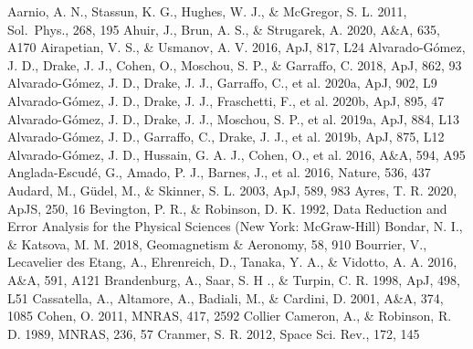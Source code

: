 \documentclass[preprint]{aastex}
\begin{document}
\begin{thebibliography}{}
Aarnio, A. N., Stassun, K. G., Hughes, W. J., \& McGregor, S. L. 2011,
  Sol.~Phys., 268, 195
Ahuir, J., Brun, A. S., \& Strugarek, A. 2020, A\&A, 635, A170
Airapetian, V. S., \& Usmanov, A. V. 2016, ApJ, 817, L24
Alvarado-G\'{o}mez, J. D., Drake, J. J., Cohen, O., Moschou, S. P.,
  \& Garraffo, C. 2018, ApJ, 862, 93
Alvarado-G\'{o}mez, J. D., Drake, J. J., Garraffo, C., et al. 2020a,
  ApJ, 902, L9
Alvarado-G\'{o}mez, J. D., Drake, J. J., Fraschetti, F., et al. 2020b,
  ApJ, 895, 47
Alvarado-G\'{o}mez, J. D., Drake, J. J., Moschou, S. P., et al. 2019a,
  ApJ, 884, L13
Alvarado-G\'{o}mez, J. D., Garraffo, C., Drake, J. J., et al. 2019b,
  ApJ, 875, L12
Alvarado-G\'{o}mez, J. D., Hussain, G. A. J., Cohen, O., et al. 2016,
  A\&A, 594, A95
Anglada-Escud\'{e}, G., Amado, P. J., Barnes, J., et al. 2016, Nature,
  536, 437
Audard, M., G\"{u}del, M., \& Skinner, S. L. 2003, ApJ, 589, 983
Ayres, T. R. 2020, ApJS, 250, 16
Bevington, P. R., \& Robinson, D. K. 1992, Data Reduction and Error
  Analysis for the Physical Sciences (New York: McGraw-Hill)
Bondar, N. I., \& Katsova, M. M. 2018, Geomagnetism \& Aeronomy, 58, 910
Bourrier, V., Lecavelier des Etang, A., Ehrenreich, D., Tanaka, Y. A., \&
  Vidotto, A. A. 2016, A\&A, 591, A121
Brandenburg, A., Saar, S. H ., \& Turpin, C. R. 1998, ApJ, 498, L51
Cassatella, A., Altamore, A., Badiali, M., \& Cardini, D. 2001, A\&A, 374, 1085
Cohen, O. 2011, MNRAS, 417, 2592
Collier Cameron, A., \& Robinson, R. D. 1989, MNRAS, 236, 57
Cranmer, S. R. 2012, Space Sci. Rev., 172, 145

\end{thebibliography}
\end{document}
